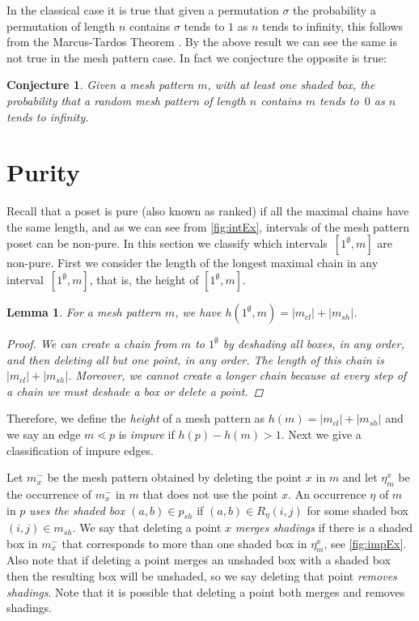 \documentclass[preprint,11pt]{elsarticle}
\newtheorem{lem}[thm]{Lemma}\crefname{lem}{Lemma}{Lemmas}
\newtheorem{conj}[thm]{Conjecture}\crefname{conj}{Conjecture}{Conjectures}
\newcommand\cl[1]{#1_{cl}}
\newcommand\sh[1]{#1_{sh}}
\newcommand\occX[2]{\eta^{#2}_{#1}}
\newcommand\mX[2]{#1^{-}_{#2}}
\newcommand\h{h}
\numberwithin{equation}{section}
\numberwithin{figure}{section}
\numberwithin{thm}{section}
\begin{document}
In the classical case it is true that given a permutation $\sigma$ the
probability a permutation of length $n$ contains $\sigma$ tends to $1$ as $n$
tends to infinity, this follows from the Marcus-Tardos Theorem \cite{MT04}. By
the above result we can see the same is not true in the mesh pattern case. In
fact we conjecture the opposite is true:

\begin{conj}
Given a mesh pattern $m$, with at least one shaded box, the probability that a random mesh pattern of length
$n$ contains $m$ tends to~$0$ as $n$ tends to infinity.
\end{conj}




\section{Purity}\label{sec:purity}
Recall that a poset is pure (also known as ranked) if all the maximal chains have the same length, and as we
can see from \cref{fig:intEx}, intervals of the mesh pattern poset can be non-pure. In this section we classify
which intervals~$[1^\emptyset,m]$ are non-pure. First we consider the length of the longest maximal chain in
any interval~$[1^\emptyset,m]$, that is, the height of $[1^\emptyset,m]$.

\begin{lem}
For a mesh pattern $m$, we have $\h(1^\emptyset,m)=|\cl{m}|+|\sh{m}|$.
\begin{proof}
We can create a chain from $m$ to $1^\emptyset$ by deshading all boxes, in any order,
and then deleting all but one point, in any order. The length of this chain is $|\cl{m}|+|\sh{m}|$.
Moreover, we cannot create a longer chain because at every
step of a chain we must deshade a box or delete a point.
\end{proof}
\end{lem}

Therefore, we define the \emph{height} of a mesh pattern as $\h(m)=|\cl{m}|+|\sh{m}|$ and we say an
edge $m\lessdot p$ is \emph{impure} if $\h(p)-\h(m)>1$.
Next we give a classification of impure edges.

 Let $\mX{m}{x}$ be the mesh pattern obtained by deleting the
point $x$ in $m$ and let $\occX{m}{x}$ be the occurrence of $\mX{m}{x}$ in $m$ that does not
use the point $x$. An occurrence $\eta$ of $m$ in $p$ \emph{uses the shaded box $(a,b)\in\sh{p}$}
if $(a,b)\in R_\eta(i,j)$ for some shaded box $(i,j)\in\sh{m}$. We say that
deleting a point $x$ \emph{merges shadings} if
there is a shaded box in $\mX{m}{x}$ that corresponds to more than one shaded box in
$\occX{m}{x}$, see \cref{fig:impEx}. Also note that if deleting a point merges an unshaded box with a
shaded box then the resulting box will be unshaded, so we say deleting that point \emph{removes shadings}.
Note that it is possible that deleting a point both merges and removes shadings.
\end{document}
